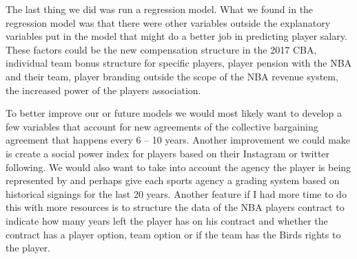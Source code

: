 \documentclass[]{article}
\begin{document}
The last thing we did was run a regression model. What we found in the
regression model was that there were other variables outside the
explanatory variables put in the model that might do a better job in
predicting player salary. These factors could be the new compensation
structure in the 2017 CBA, individual team bonus structure for specific
players, player pension with the NBA and their team, player branding
outside the scope of the NBA revenue system, the increased power of the
players association.

To better improve our or future models we would most likely want to
develop a few variables that account for new agreements of the
collective bargaining agreement that happens every 6 -- 10 years.
Another improvement we could make is create a social power index for
players based on their Instagram or twitter following. We would also
want to take into account the agency the player is being represented by
and perhaps give each sports agency a grading system based on historical
signings for the last 20 years. Another feature if I had more time to do
this with more resources is to structure the data of the NBA players
contract to indicate how many years left the player has on his contract
and whether the contract has a player option, team option or if the team
has the Birds rights to the player.
\end{document}
